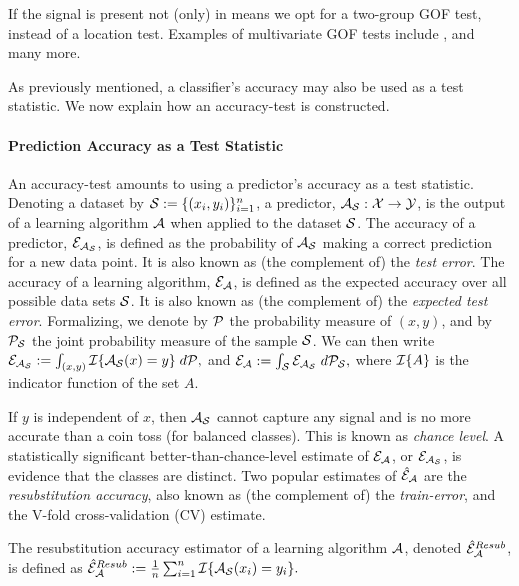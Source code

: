 \documentclass[oupdraft]{bio}
\begin{document}
If the signal is present not (only) in means we opt for a two-group GOF test, instead of a location test. 
Examples of multivariate GOF tests include \cite{bickel1969distribution,friedman1979multivariate,hall2002permutation,szekely2004testing,Biau2005,gretton_kernel_2012-1}, and many more.

As previously mentioned, a classifier's accuracy may also be used as a test statistic. 
We now explain how an accuracy-test is constructed. 


\paragraph{Prediction Accuracy as a Test Statistic}
An accuracy-test amounts to using a predictor's accuracy as a test statistic.  
Denoting a dataset by $\mathcal{S}:=\{(x_i,y_i)\}_{i=1}^n$, a predictor, $\mathcal{A}_{\mathcal{S}}:\mathcal{X} \to \mathcal{Y}$, is the output of a learning algorithm $\mathcal{A}$ when applied to the dataset $\mathcal{S}$. 
The accuracy of a predictor, $\mathcal{E}_{\mathcal{A}_{\mathcal{S}}}$, is defined as the probability of $\mathcal{A}_{\mathcal{S}}$ making a correct prediction for a new data point. 
It is also known as (the complement of) the \emph{test error}.
The accuracy of a learning algorithm, $\mathcal{E}_{\mathcal{A}}$, is defined as the expected accuracy over all possible data sets $\mathcal{S}$. 
It is also known as (the complement of) the \emph{expected test error}.
Formalizing, we denote by $\mathcal{P}$ the probability measure of $(x, y)$, and by $\mathcal{P}_{\mathcal{S}}$ the joint probability measure of the sample $\mathcal{S}$. 
We can then write $\mathcal{E}_{\mathcal{A}_{\mathcal{S}}}:=\int_{(x,y)} \mathcal{I}{\{ \mathcal{A}_{\mathcal{S}}(x)=y \}} \; d\mathcal{P},$
and
$\mathcal{E}_{\mathcal{A}}:=\int_{\mathcal{S}} \mathcal{E}_{\mathcal{A}_{\mathcal{S}}} \; d\mathcal{P}_{\mathcal{S}},$
where $\mathcal{I}{\{ A \}}$ is the indicator function of the set $A$. 

If $y$ is independent of $x$, then $\mathcal{A}_{\mathcal{S}}$ cannot capture any signal and is no more accurate than a coin toss (for balanced classes). 
This is known as \emph{chance level}.
A statistically significant better-than-chance-level estimate of $\mathcal{E}_{\mathcal{A}}$, or $\mathcal{E}_{\mathcal{A}_{\mathcal{S}}}$, is evidence that the classes are distinct. 
Two popular estimates of $\hat{\mathcal{E}}_{\mathcal{A}}$ are the \emph{resubstitution accuracy}, also known as (the complement of) the \emph{train-error}, and the V-fold cross-validation (CV) estimate.
\begin{definition}
	\label{def:resubstitution}
	The resubstitution accuracy estimator of a learning algorithm $\mathcal{A}$, denoted $\hat{\mathcal{E}}_{\mathcal{A}}^{Resub}$,  is defined as
	$\hat{\mathcal{E}}_{\mathcal{A}}^{Resub} := \frac 1n \sum_{i=1}^{n} \mathcal{I}{\{ \mathcal{A}_{\mathcal{S}}(x_i)=y_i \}}.$
\end{definition}
\end{document}
